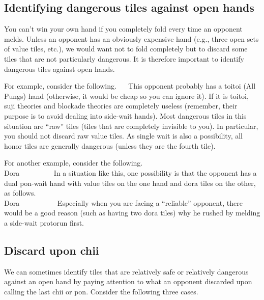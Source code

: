 {{\subsection{Identifying dangerous tiles against open hands}

You can't win your own hand if you completely fold every time an opponent melds. Unless an opponent has an obviously expensive hand (e.g., three open sets of value tiles, etc.), we would want not to fold completely but to discard some tiles that are not particularly dangerous. It is therefore important to identify dangerous tiles against open hands. 

\bigskip
For example, consider the following. 
\bp
{}
\rfa\fa\fa~~
\ep
This opponent probably has a {\jap toitoi} (All Pungs) hand (otherwise, it would be cheap so you can ignore it). If it is {\jap toitoi}, {\jap suji} theories and blockade theories are completely useless (remember, their purpose is to avoid dealing into side-wait hands). 
Most dangerous tiles in this situation are ``raw'' tiles (tiles that are completely invisible to you). In particular, you should not discard raw value tiles. As single wait is also a possibility, all honor tiles are generally dangerous (unless they are the fourth tile). 

\bigskip
For another example, consider the following. 
\vspace{-10pt}
\bp
{}
~~~\\
\hfill\footnotesize{{\jap Dora}~~~~~~~~~}
\ep
In a situation like this, one possibility is that the opponent has a dual {\jap pon}-wait hand with value tiles on the one hand and {\jap dora} tiles on the other, as follows. 
\bp
{}\fa\fa
~~~~\\
\hfill\footnotesize{{\jap Dora}~~~~~~~~~~}
\ep
Especially when you are facing a ``reliable'' opponent, there would be a good reason (such as having two {\jap dora} tiles) why he rushed by melding a side-wait protorun first. 

\newpage
\subsection{Discard upon {\jap chii}}

We can sometimes identify tiles that are relatively safe or relatively dangerous against an open hand by paying attention to what an opponent discarded upon calling the last {\jap chii} or {\jap pon}. Consider the following three cases. 

}}
